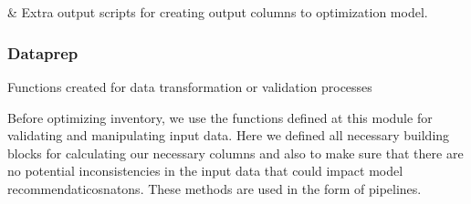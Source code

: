 \documentclass[letterpaper,10pt,english]{sphinxmanual}
\begin{document}
\begin{savenotes}\sphinxatlongtablestart\begin{longtable}[c]{}
\hline

\endfirsthead

%
{}\\
\hline

\endhead

\hline
{}\\
\endfoot

\endlastfoot

{\hyperref[\detokenize{source/optimization.datatools:module-optimization.datatools.extra_output}]{}}
&
Extra output scripts for creating output columns to optimization model.
\\
\hline
\end{longtable}\sphinxatlongtableend\end{savenotes}


\subsubsection{Dataprep}
\label{\detokenize{source/optimization.datatools:module-optimization.datatools.dataprep}}\label{\detokenize{source/optimization.datatools:dataprep}}
Functions created for data transformation or validation processes

Before optimizing inventory, we use the functions defined at this module for validating and manipulating
input data. Here we defined all necessary building blocks for calculating our necessary columns and also to
make sure that there are no potential inconsistencies in the input data that could impact model recommendaticosnatons.
These methods are used in the form of pipelines.
\end{document}
